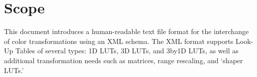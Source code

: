 \cleardoublepage
\numberedformat	
\chapter{Scope} 	%

This document introduces a human-readable text file format for the interchange of color transformations using an XML schema. The XML format supports Look-Up Tables of several types: 1D LUTs, 3D LUTs, and 3by1D LUTs, as well as additional transformation needs such as matrices, range rescaling, and `shaper LUTs.'